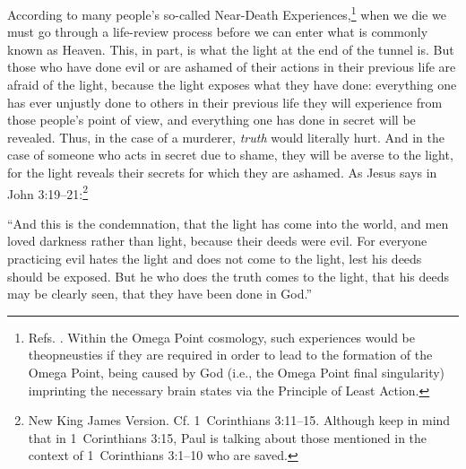 \documentclass[letterpaper,12pt]{article}
\newenvironment{squote}
  {\small\quote}
  {\endquote\normalsize}
\begin{document}
According to many people's so-called Near-Death Experiences,\footnote{\label{NearDeathExperience}Refs. . Within the Omega Point cosmology, such experiences would be theopneusties if they are required in order to lead to the formation of the Omega Point, being caused by God (i.e., the Omega Point final singularity) imprinting the necessary brain states via the Principle of Least Action.} when we die we must go through a life-review process before we can enter what is commonly known as Heaven. This, in part, is what the light at the end of the tunnel is. But those who have done evil or are ashamed of their actions in their previous life are afraid of the light, because the light exposes what they have done: everything one has ever unjustly done to others in their previous life they will experience from those people's point of view, and everything one has done in secret will be revealed. Thus, in the case of a murderer, \emph{truth} would literally hurt. And in the case of someone who acts in secret due to shame, they will be averse to the light, for the light reveals their secrets for which they are ashamed. As Jesus says in John 3:19--21:\footnote{New King James Version. Cf. 1~Corinthians 3:11--15. Although keep in mind that in 1~Corinthians 3:15, Paul is talking about those mentioned in the context of 1~Corinthians 3:1--10 who are saved.}

\begin{squote}
``And this is the condemnation, that the light has come into the world, and men loved darkness rather than light, because their deeds were evil. For everyone practicing evil hates the light and does not come to the light, lest his deeds should be exposed. But he who does the truth comes to the light, that his deeds may be clearly seen, that they have been done in God.''
\end{squote}
\end{document}
